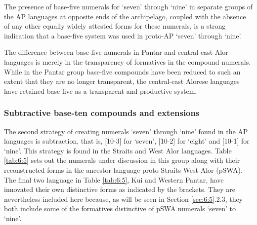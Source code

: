 \documentclass[output=paper]{LSP/langsci}
\begin{document}
The presence of base-five numerals for `seven' through `nine' in separate groups of the AP languages at opposite ends of the archipelago, coupled with the absence of any other equally widely attested forms for these numerals, is a strong indication that a base-five system was used in proto-AP `seven' through `nine'. 

The difference between base-five numerals in Pantar and central-east Alor languages is merely in the transparency of formatives in the compound numerals. While in the Pantar group base-five compounds have been reduced to such an extent that they are no longer transparent, the central-east Alorese languages have retained base-five as a transparent and productive system. 

\subsubsection{Subtractive base-ten compounds and extensions}
The second strategy of creating numerals `seven' through `nine' found in the AP languages is subtraction, that is, [10-3] for `seven', [10-2] for `eight' and  [10-1] for `nine'. This strategy is found in the Straits and West Alor languages. Table \ref{tab:6:5} sets out the numerals under discussion in this group along with their reconstructed forms in the ancestor language proto-Straits-West Alor (pSWA). The final two language in Table \ref{tab:6:5}, Kui and Western Pantar, have innovated their own distinctive forms as indicated by the brackets. They are nevertheless included here because, as will be seen in Section \ref{sec:6:5}.2.3, they both include some of the formatives distinctive of pSWA numerals `seven' to `nine'.
\end{document}
